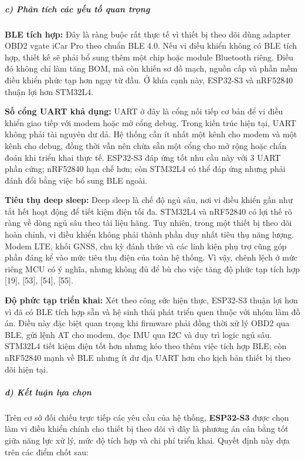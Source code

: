 \documentclass[a4paper]{extarticle}
\begin{document}
\subparagraph{c) Phân tích các yếu tố quan
trọng}\label{c-phuxe2n-tuxedch-cuxe1c-yux1ebfu-tux1ed1-quan-trux1ecdng}

\textbf{BLE tích hợp:} Đây là ràng buộc rất thực tế vì thiết bị theo dõi dùng
adapter OBD2 vgate iCar Pro theo chuẩn BLE 4.0. Nếu vi điều khiển không
có BLE tích hợp, thiết kế sẽ phải bổ sung thêm một chip hoặc module
Bluetooth riêng. Điều đó không chỉ làm tăng BOM, mà còn khiến sơ đồ
mạch, nguồn cấp và phần mềm điều khiển phức tạp hơn ngay từ đầu. Ở khía
cạnh này, ESP32-S3 và nRF52840 thuận lợi hơn STM32L4.

\textbf{Số cổng UART khả dụng:} UART ở đây là cổng nối tiếp cơ bản để vi
điều khiển giao tiếp với modem hoặc mở cổng debug. Trong kiến trúc hiện
tại, UART không phải tài nguyên dư dả. Hệ thống cần ít nhất một kênh
cho modem và một kênh cho debug, đồng thời vẫn nên chừa sẵn một cổng cho mở
rộng hoặc chẩn đoán khi triển khai thực tế. ESP32-S3 đáp ứng tốt nhu cầu
này với 3 UART phần cứng; nRF52840 hạn chế hơn; còn STM32L4 có thể đáp
ứng nhưng phải đánh đổi bằng việc bổ sung BLE ngoài.

\textbf{Tiêu thụ deep sleep:} Deep sleep là chế độ ngủ sâu, nơi vi điều
khiển gần như tắt hết hoạt động để tiết kiệm điện tối đa. STM32L4 và
nRF52840 có lợi thế rõ ràng về dòng ngủ sâu theo tài liệu hãng. Tuy
nhiên, trong một thiết bị theo dõi hoàn chỉnh, vi điều khiển không phải thành phần
duy nhất tiêu thụ năng lượng. Modem LTE, khối GNSS, chu kỳ đánh thức và
các linh kiện phụ trợ cũng góp phần đáng kể vào mức tiêu thụ điện của toàn hệ thống. Vì
vậy, chênh lệch ở mức riêng MCU có ý nghĩa, nhưng không đủ để bù cho việc
tăng độ phức tạp tích hợp {[}19{]}, {[}53{]}, {[}54{]}, {[}55{]}.

\textbf{Độ phức tạp triển khai:} Xét theo công sức hiện thực, ESP32-S3
thuận lợi hơn vì đã có BLE tích hợp sẵn và hệ sinh thái phát triển quen
thuộc với nhóm làm đồ án. Điều này đặc biệt quan trọng khi firmware phải
đồng thời xử lý OBD2 qua BLE, gửi lệnh AT cho modem, đọc IMU qua I2C và
duy trì logic ngủ sâu. STM32L4 tiết kiệm điện tốt hơn nhưng kéo theo
thêm việc tích hợp BLE; còn nRF52840 mạnh về BLE nhưng ít dư địa UART
hơn cho kịch bản thiết bị theo dõi hiện tại.

\subparagraph{d) Kết luận lựa
chọn}\label{d-kux1ebft-luux1eadn-lux1ef1a-chux1ecdn}

Trên cơ sở đối chiếu trực tiếp các yêu cầu của hệ thống,
\textbf{ESP32-S3} được chọn làm vi điều khiển chính cho thiết bị theo dõi
vì đây là phương án cân bằng tốt giữa năng lực xử lý, mức độ tích hợp và
chi phí triển khai. Quyết định này dựa trên các điểm chốt sau:
\end{document}

